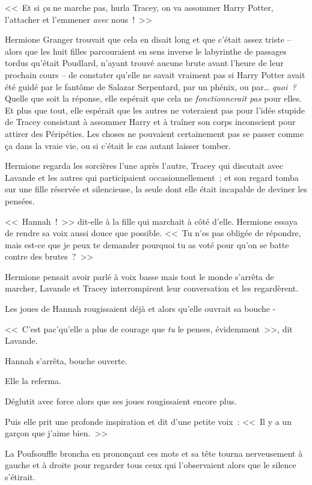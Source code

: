 <<~Et si \emph{ça} ne marche pas, hurla Tracey, on va assommer Harry Potter, l'attacher et l'emmener \emph{avec} nous~!~>>

\later

Hermione Granger trouvait que cela en disait long et que c'était assez triste -- alors que les huit filles parcouraient en sens inverse le labyrinthe de passages tordus qu'était Poudlard, n'ayant trouvé aucune brute avant l'heure de leur prochain cours -- de constater qu'elle ne savait vraiment pas si Harry Potter avait été guidé par le fantôme de Salazar Serpentard, par un phénix, ou par… \emph{quoi~?} Quelle que soit la réponse, elle espérait que cela ne \emph{fonctionnerait pas} pour elles. Et plus que tout, elle espérait que les autres ne voteraient pas pour l'idée stupide de Tracey consistant à assommer Harry et à traîner son corps inconscient pour attirer des Péripéties. Les choses ne pouvaient certainement pas se passer comme ça dans la vraie vie, ou si c'était le cas autant laisser tomber.

Hermione regarda les sorcières l'une après l'autre, Tracey qui discutait avec Lavande et les autres qui participaient occasionnellement~; et son regard tomba sur une fille réservée et silencieuse, la seule dont elle était incapable de deviner les pensées.

<<~Hannah~!~>> dit-elle à la fille qui marchait à côté d'elle. Hermione essaya de rendre sa voix aussi douce que possible. <<~Tu n'es pas obligée de répondre, mais est-ce que je peux te demander pourquoi tu as voté pour qu'on se batte contre des brutes~?~>>

Hermione pensait avoir parlé à voix basse mais tout le monde s'arrêta de marcher, Lavande et Tracey interrompirent leur conversation et les regardèrent.

Les joues de Hannah rougissaient déjà et alors qu'elle ouvrait sa bouche -

<<~C'est pac'qu'elle a plus de courage que \emph{tu} le penses, évidemment~>>, dit Lavande.

Hannah s'arrêta, bouche ouverte.

Elle la referma.

Déglutit avec force alors que ses joues rougissaient encore plus.

Puis elle prit une profonde inspiration et dit d'une petite voix~: <<~Il y a un garçon que j'aime bien.~>>

La Poufsouffle broncha en prononçant ces mots et sa tête tourna nerveusement à gauche et à droite pour regarder tous ceux qui l'observaient alors que le silence s'étirait.

